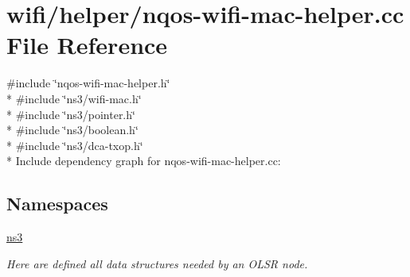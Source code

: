 \hypertarget{nqos-wifi-mac-helper_8cc}{}\section{wifi/helper/nqos-\/wifi-\/mac-\/helper.cc File Reference}
\label{nqos-wifi-mac-helper_8cc}
{\ttfamily \#include \char`\"{}nqos-\/wifi-\/mac-\/helper.\+h\char`\"{}}\\*
{\ttfamily \#include \char`\"{}ns3/wifi-\/mac.\+h\char`\"{}}\\*
{\ttfamily \#include \char`\"{}ns3/pointer.\+h\char`\"{}}\\*
{\ttfamily \#include \char`\"{}ns3/boolean.\+h\char`\"{}}\\*
{\ttfamily \#include \char`\"{}ns3/dca-\/txop.\+h\char`\"{}}\\*
Include dependency graph for nqos-\/wifi-\/mac-\/helper.cc\+:
\subsection*{Namespaces}
\begin{DoxyCompactItemize}
\item 
 \hyperlink{namespacens3}{ns3}
\begin{DoxyCompactList}\small\item\em Here are defined all data structures needed by an O\+L\+SR node. \end{DoxyCompactList}\end{DoxyCompactItemize}
